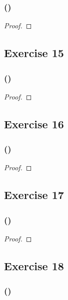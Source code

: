 \documentclass[14pt]{extarticle}
\begin{document}
\subsubsection{()}

\begin{proof}

\end{proof}

\subsection{Exercise 15}

\subsubsection{()}

\begin{proof}

\end{proof}

\subsection{Exercise 16}

\subsubsection{()}

\begin{proof}

\end{proof}

\subsection{Exercise 17}

\subsubsection{()}

\begin{proof}

\end{proof}

\subsection{Exercise 18}

\subsubsection{()}
\end{document}
